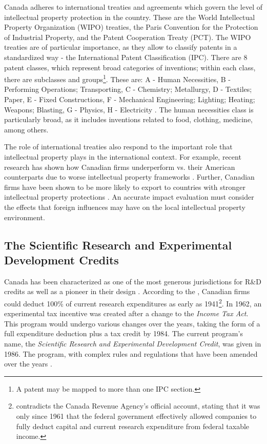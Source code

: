 \documentclass[../main.tex]{subfiles}
\begin{document}

Canada adheres to international treaties and agreements which govern the level of intellectual property protection in the country. These are the World Intellectual Property Organization (WIPO) treaties, the Paris Convention for the Protection of Industrial Property, and the Patent Cooperation Treaty (PCT). The WIPO treaties are of particular importance, as they allow to classify patents in a standardized way - the International Patent Classification (IPC). There are 8 patent classes, which represent broad categories of inventions; within each class, there are subclasses and groups\footnote{A patent may be mapped to more than one IPC section.}. These are: A - Human Necessities, B - Performing Operations; Transporting, C - Chemistry; Metallurgy, D - Textiles; Paper, E - Fixed Constructions, F - Mechanical Engineering; Lighting; Heating; Weapons; Blasting, G - Physics, H - Electricity \parencite{worldintellectualpropertyorganization24}. The human necessities class is particularly broad, as it includes inventions related to food, clothing, medicine, among others. 
 
The role of international treaties also respond to the important role that intellectual property plays in the international context. For example, recent research has shown how Canadian firms underperform vs. their American counterparts due to worse intellectual property frameworks \parencite{carew_etal06}. Further, Canadian firms have been shown to be more likely to export to countries with stronger intellectual property protections \parencite{rafiquzzaman02}. An accurate impact evaluation must consider the effects that foreign influences may have on the local intellectual property environment.

\subsection{The Scientific Research and Experimental Development Credits}

Canada has been characterized as one of the most generous jurisdictions for R\&D credits \parencite{mckenzie08} as well as a pioneer in their design \parencite{mansfield_switzer85a}. According to the \textcite{canadarevenueagency23}, Canadian firms could deduct 100\% of current research expenditures as early as 1941\footnote{\textcite{mansfield_switzer85a} contradicts the Canada Revenue Agency's official account, stating that it was only since 1961 that the federal government effectively allowed companies to fully deduct capital and current research expenditure from federal taxable income.}. In 1962, an experimental tax incentive was created after a change to the \textit{Income Tax Act}. This program would undergo various changes over the years, taking the form of a full expenditure deduction plus a tax credit by 1984. The current program's name, the \textit{Scientific Research and Experimental Development Credit}, was given in 1986. The program, with complex rules and regulations that have been amended over the years \parencite{canadarevenueagency15}.
\end{document}
